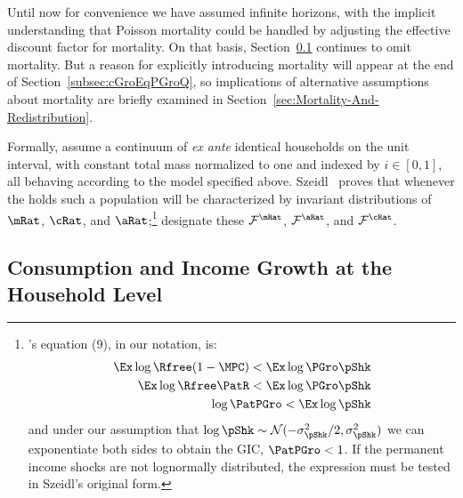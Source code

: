 \documentclass[BufferStockTheory]{subfiles}
\begin{document}

Until now for convenience we have assumed infinite horizons, with the implicit understanding that Poisson mortality could be handled by adjusting the effective discount factor for mortality.  On that basis, Section~\ref{subsec:cGroEqPGroIndQ} continues to omit mortality.  But a reason for explicitly introducing mortality will appear at the end of Section~\ref{subsec:cGroEqPGroQ}, so implications of alternative assumptions about mortality are briefly examined in Section~\ref{sec:Mortality-And-Redistribution}.

Formally, assume a continuum of \textit{ex ante} identical households on the unit interval, with constant total mass normalized to one and indexed by $i \in [0,1]$, all behaving according to the model specified above.  Szeidl~\citeyearpar{szeidlInvariant} proves that whenever the {\GIC} holds such a population will be characterized by invariant distributions of $\mRat$, $\cRat$, and $\aRat$;\footnote{\cite{szeidlInvariant}'s equation (9), in our notation, is:
  \begin{align*}
    \Ex \log \Rfree (1-\MPC) < \Ex \log \PGro \pShk
    \\  \Ex \log \Rfree \PatR    < \Ex \log \PGro \pShk
\\ \log \PatPGro < \Ex \log \pShk
  \end{align*}
  and under our assumption that $\log \pShk \sim \mathcal{N}(-\sigma^{2}_{\pShk}/2,\sigma^{2}_{\pShk})$ we can exponentiate both sides to obtain the GIC, $\PatPGro < 1$.  If the permanent income shocks are not lognormally distributed, the expression must be tested in Szeidl's original form.
} designate these $\mathcal{F}^{\mRat}$, $\mathcal{F}^{\aRat}$, and $\mathcal{F}^{\cRat}$.%


\hypertarget{Consumption-and-Income-Growth-at-the-Household-Level}{}
\subsection{Consumption and Income Growth at the Household Level}\label{subsec:cGroEqPGroIndQ}
\end{document}
